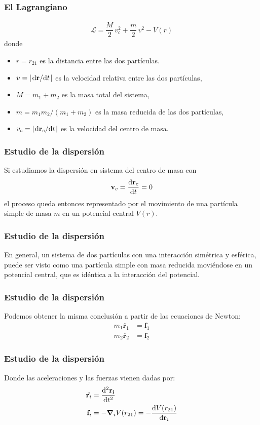 \begin{frame}[fragile]
\frametitle{El Lagrangiano}
\begin{align}
\mathcal{L} = \dfrac{M}{2} \, v_{c}^{2} + \dfrac{m}{2} \, v^{2} - V(r)
\end{align}
donde
\fontsize{12}{12}\selectfont
\begin{itemize}[<+->]
\item [\textcolor{red}{\checkmark}] $r = r_{21}$ es la distancia entre las dos partículas.
\item [\textcolor{red}{\checkmark}] $v = \abs{\dv*{\mathbf{r}}{t}}$ es la velocidad relativa entre las dos partículas,
\item [\textcolor{red}{\checkmark}] $M = m_{1} + m_{2}$ es la masa total del sistema,
\item [\textcolor{red}{\checkmark}] $m = m_{1}m_{2}/(m_{1} + m_{2})$ es la masa reducida de las dos partículas,
\item [\textcolor{red}{\checkmark}] $v_{c} = \abs{\dv*{\mathbf{r}_{c}}{t}}$ es la velocidad del centro de masa.
\end{itemize}
\end{frame}
\begin{frame}
\frametitle{Estudio de la dispersión}
Si estudiamos la dispersión en sistema del centro de masa con 
\begin{align*}
\mathbf{v}_{c} = \dv{\mathbf{r}_{c}}{t} = 0
\end{align*}
el proceso queda entonces representado por el movimiento de una partícula simple de masa $m$ en un potencial central $V(r)$.
\end{frame}
\begin{frame}
\frametitle{Estudio de la dispersión}
En general, un sistema de dos partículas con una interacción simétrica y esférica, puede ser visto como una partícula simple con masa reducida moviéndose en un potencial central, que es idéntica a la interacción del potencial.
\end{frame}
\begin{frame}
\frametitle{Estudio de la dispersión}
Podemos obtener la misma conclusión a partir de las ecuaciones de Newton:
\begin{align*}
m_{1} \ddot{\mathbf{r}_{1}} &= \mathbf{f}_{1} \\
m_{2} \ddot{\mathbf{r}_{2}} &= \mathbf{f}_{2} 
\end{align*}
\end{frame}
\begin{frame}
\frametitle{Estudio de la dispersión}
Donde las aceleraciones y las fuerzas vienen dadas por:
\begin{align*}
\ddot{\mathbf{r}_{i}} &= \dv[2]{\mathbf{r_{i}}}{t} \\
\mathbf{f}_{i} &= - \gradient_{i} V(r_{21}) = - \dv{V(r_{21})}{\mathbf{r}_{i}}
\end{align*}
\end{frame}
